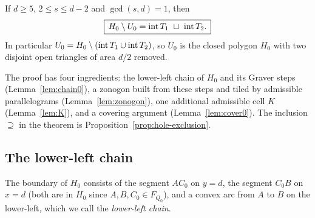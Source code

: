 \begin{theorem}\label{thm:exceptional}
If $d\ge5$, $2\le s\le d-2$ and $\gcd(s,d)=1$, then
\[
  \boxed{\,H_0\setminus U_0=\operatorname{int} T_1\ \sqcup\ \operatorname{int} T_2.\,}
\]
In particular $U_0=H_0\setminus(\operatorname{int} T_1\cup\operatorname{int} T_2)$, so $U_0$ is the closed polygon $H_0$ with two disjoint open triangles of area $d/2$ removed.
\end{theorem}

The proof has four ingredients: the lower-left chain of $H_0$ and its Graver steps (Lemma~\ref{lem:chain0}), a zonogon built from these steps and tiled by admissible parallelograms (Lemma~\ref{lem:zonogon}), one additional admissible cell $K$ (Lemma~\ref{lem:K}), and a covering argument (Lemma~\ref{lem:cover0}). The inclusion $\supseteq$ in the theorem is Proposition~\ref{prop:hole-exclusion}.

\subsection{The lower-left chain}

The boundary of $H_0$ consists of the segment $AC_0$ on $y=d$, the segment $C_0B$ on $x=d$ (both are in $H_0$ since $A,B,C_0\in F_{Q_0}$), and a convex arc from $A$ to $B$ on the lower-left, which we call the \emph{lower-left chain}.

